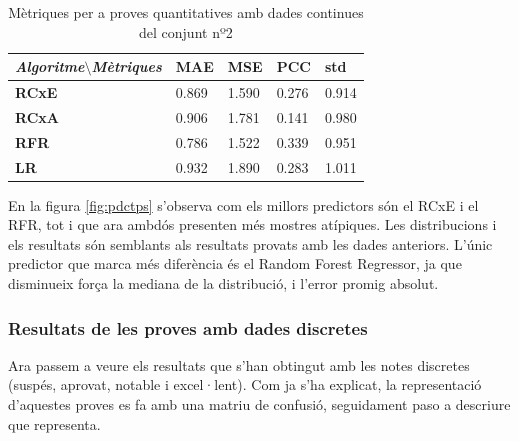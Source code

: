 \documentclass[12pt,a4paper,catalan]{article}
\begin{document}
\begin{table}[h]
\centering
\begin{tabular}{lllll}
\hline
\textit{\textbf{Algoritme$\setminus$Mètriques}} & \textbf{MAE} & \textbf{MSE} & \textbf{PCC} & \textbf{std} \\ \hline
\textbf{RCxE}          & 0.869          & 1.590          & 0.276          & 0.914          \\
\textbf{RCxA}          & 0.906          & 1.781          & 0.141          & 0.980          \\
\textbf{RFR}           & 0.786          & 1.522          & 0.339          & 0.951          \\
\textbf{LR}            & 0.932          & 1.890          & 0.283          & 1.011          \\ \hline
\end{tabular}
\caption{Mètriques per a proves quantitatives amb dades continues del conjunt nº2}
\label{tab:mpqdcc2}
\end{table}

\newpage

En la figura \ref{fig:pdctps} s'observa com els millors predictors són el RCxE i el RFR, tot i que ara ambdós presenten més mostres atípiques. Les distribucions i els resultats són semblants als resultats provats amb les dades anteriors. L'únic predictor que marca més diferència és el Random Forest Regressor, ja que disminueix força  la mediana de la distribució, i l'error promig absolut.

\newpage

\subsubsection{Resultats de les proves amb dades discretes}

Ara passem a veure els resultats que s'han obtingut amb les notes discretes (suspés, aprovat, notable i excel·lent). Com ja s'ha explicat, la representació d'aquestes proves es fa amb una matriu de confusió, seguidament paso a descriure que representa.
\end{document}
